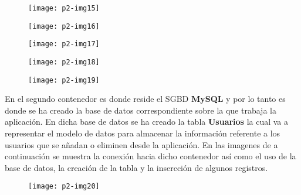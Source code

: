 \documentclass[10pt]{article}
\begin{document}
 \begin{figure}[H]
	\begin{center}
 		\texttt{[image: p2-img15]}
	\end{center} 
\end{figure}

 \begin{figure}[H]
	\begin{center}
 		\texttt{[image: p2-img16]}
	\end{center} 
\end{figure}

 \begin{figure}[H]
	\begin{center}
 		\texttt{[image: p2-img17]}
	\end{center} 
\end{figure}

 \begin{figure}[H]
	\begin{center}
 		\texttt{[image: p2-img18]}
	\end{center} 
\end{figure}

 \begin{figure}[H]
	\begin{center}
 		\texttt{[image: p2-img19]}
	\end{center} 
\end{figure}

En el segundo contenedor es donde reside el SGBD \textbf{MySQL} y por lo tanto es donde se ha creado la base de datos correspondiente sobre la que trabaja la aplicación. En dicha base de datos se ha creado la tabla \textbf{Usuarios} la cual va a representar el modelo de datos para almacenar la información referente a los usuarios que se añadan o eliminen desde la aplicación. En las imagenes de a continuación se muestra la conexión hacia dicho contenedor así como el uso de la base de datos, la creación de la tabla y la insercción de algunos registros.\\

 \begin{figure}[H]
	\begin{center}
 		\texttt{[image: p2-img20]}
	\end{center} 
\end{figure} 
\end{document}
